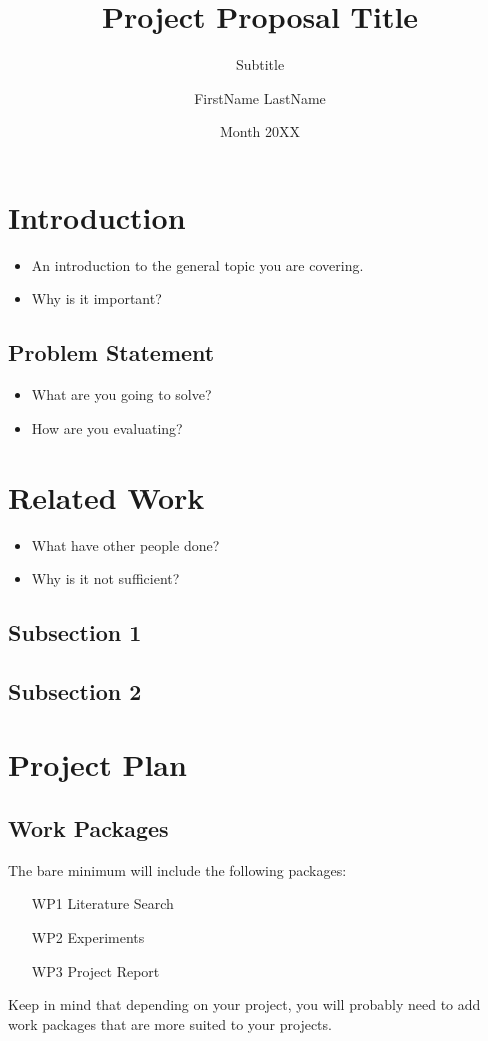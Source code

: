 \documentclass[rnd]{proposal_style_template} %
\title{Project Proposal Title}
\subtitle{Subtitle}
\author{FirstName LastName}
\date{Month 20XX}
\begin{document}
\maketitle

\pagestyle{plain}

\section{Introduction}
\begin{itemize}
    \item An introduction to the general topic you are covering.
    \item Why is it important?
\end{itemize}

\subsection{Problem Statement}
\begin{itemize}
    \item What are you going to solve?
    \item How are you evaluating?
\end{itemize}


\section{Related Work}
\begin{itemize}
    \item What have other people done?
    \item Why is it not sufficient?
\end{itemize}

\subsection{Subsection 1}
\subsection{Subsection 2}



\section{Project Plan}

\subsection{Work Packages}
The bare minimum will include the following packages:
\begin{enumerate}
    \item[WP1] Literature Search
    \item[WP2] Experiments
    \item[WP3] Project Report
\end{enumerate}
Keep in mind that depending on your project, you will probably need to add work packages that are more suited to your projects.
\end{document}
